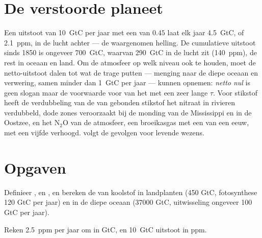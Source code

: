\section{De verstoorde planeet}

\begin{example}\label{ex:b2:biogeochemical-cycles:numbers}
Een uitstoot van \qty{10}{GtC} per jaar met een  van
$0.45$ laat elk jaar \qty{4.5}{GtC}, of \qty{2.1}{ppm}, in de lucht achter
--- de waargenomen helling. De cumulatieve uitstoot sinds 1850 is ongeveer
\qty{700}{GtC}, waarvan \qty{290}{GtC} in de lucht zit (140~ppm), de
rest in oceaan en land. Om de atmosfeer op welk niveau ook te houden, moet de
netto-uitstoot dalen tot wat de trage putten --- menging naar de diepe oceaan
en verwering, samen minder dan \qty{1}{GtC} per jaar --- kunnen opnemen:
\emph{netto nul} is geen slogan maar de voorwaarde voor  van
het  met een zeer lange $\tau$. Voor stikstof heeft de verdubbeling van
de  van gebonden stikstof het nitraat in rivieren verdubbeld, dode zones
veroorzaakt bij de monding van de Mississippi en in de Oostzee, en het
$\mathrm{N_2O}$ van de atmosfeer, een broeikasgas met een 
van een eeuw, met een vijfde verhoogd.  volgt
de gevolgen voor levende wezens.
\end{example}

\section{Opgaven}

\begin{exercise}[$\star$]\label{exo:b2:biogeochemical-cycles:1}
Definieer ,  en , en bereken de  van
koolstof in landplanten (450 GtC, fotosynthese 120 GtC per jaar) en in de
diepe oceaan (\num{37000} GtC, uitwisseling ongeveer 100 GtC per jaar).
\end{exercise}

\begin{exercise}[$\star$]\label{exo:b2:biogeochemical-cycles:2}
Reken \qty{2.5}{ppm} per jaar om in GtC, en \qty{10}{GtC}
uitstoot in ppm.
\end{exercise}

